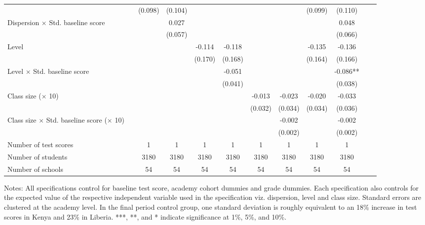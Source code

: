\begin{center}
\begin{scriptsize}
\begin{threeparttable}
\begin{tabular} {@{} l l c c c c c c c c c c  @{}}
                 &  & (0.098) & (0.104) &  &  &  &  & (0.099) & (0.110) \\
Dispersion $\times$ Std. baseline score &  &  & 0.027 &  &  &  &  &  & 0.048 \\
                 &  &  & (0.057) &  &  &  &  &  & (0.066) \\
Level &  &  &  & -0.114 & -0.118 &  &  & -0.135 & -0.136 \\
                 &  &  &  & (0.170) & (0.168) &  &  & (0.164) & (0.166) \\
Level $\times$ Std. baseline score &  &  &  &  & -0.051 &  &  &  & -0.086** \\
                 &  &  &  &  & (0.041) &  &  &  & (0.038) \\
Class size ($\times$ 10) &  &  &  &  &  & -0.013 & -0.023 & -0.020 & -0.033 \\
                 &  &  &  &  &  & (0.032) & (0.034) & (0.034) & (0.036) \\
Class size $\times$ Std. baseline score ($\times$ 10) &  &  &  &  &  &  & -0.002 &  & -0.002 \\
                 &  &  &  &  &  &  & (0.002) &  & (0.002) \\
\midrule
Number of test scores &  & 1 & 1 & 1 & 1 & 1 & 1 & 1 & 1 \\
Number of students &  & 3180 & 3180 & 3180 & 3180 & 3180 & 3180 & 3180 & 3180 \\
Number of schools &  & 54 & 54 & 54 & 54 & 54 & 54 & 54 & 54 \\
\bottomrule
\end{tabular}
\begin{tablenotes}
\item Notes: All specifications control for baseline test score, academy cohort dummies and grade dummies. Each specification also controls for the expected value of the respective independent variable used in the specification viz. dispersion, level and class size. Standard errors are clustered at the academy level. In the final period control group, one standard deviation is roughly equivalent to an 18\% increase in test scores in Kenya and 23\% in Liberia. ***, **, and * indicate significance at 1\%, 5\%, and 10\%.\end{tablenotes}
\end{threeparttable}
\end{scriptsize}
\end{center}
\clearpage
